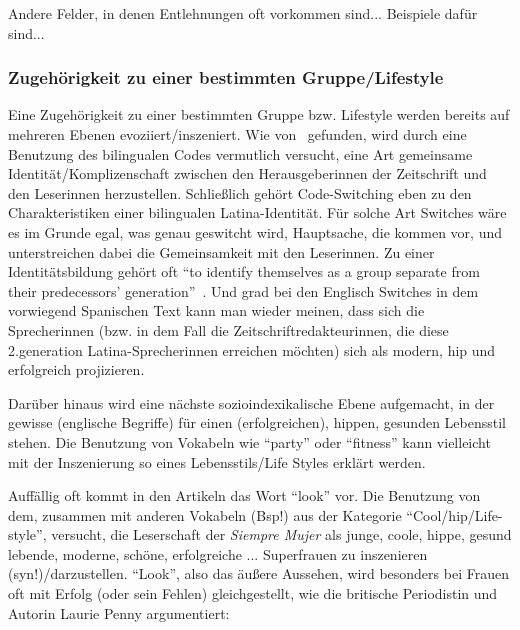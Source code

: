 Andere Felder, in denen Entlehnungen oft vorkommen sind...
Beispiele dafür sind...

\subsubsection{Zugehörigkeit zu einer bestimmten Gruppe/Lifestyle}
Eine Zugehörigkeit zu einer bestimmten Gruppe bzw. Lifestyle werden bereits auf mehreren Ebenen evoziiert/inszeniert.
Wie von~\cite{Ticknor12} gefunden, wird durch eine Benutzung des bilingualen Codes vermutlich versucht, eine Art gemeinsame Identität/Komplizenschaft zwischen den Herausgeberinnen der Zeitschrift und den Leserinnen herzustellen.
Schließlich gehört Code-Switching eben zu den Charakteristiken einer bilingualen Latina-Identität.
Für solche Art Switches wäre es im Grunde egal, was genau geswitcht wird, Hauptsache, die kommen vor, und unterstreichen dabei die Gemeinsamkeit mit den Leserinnen.
Zu einer Identitätsbildung gehört oft ``to identify themselves as a group separate from their predecessors’ generation''~\cite[]{Mahootian05}.
Und grad bei den Englisch Switches in dem vorwiegend Spanischen Text kann man wieder meinen, dass sich die Sprecherinnen (bzw. in dem Fall die Zeitschriftredakteurinnen, die diese 2.generation Latina-Sprecherinnen erreichen möchten) sich als modern, hip und erfolgreich projizieren.

Darüber hinaus wird eine nächste sozioindexikalische Ebene aufgemacht, in der gewisse (englische Begriffe) für einen (erfolgreichen), hippen, gesunden Lebensstil stehen. %
Die Benutzung von Vokabeln wie ``party'' oder ``fitness'' kann vielleicht mit der Inszenierung so eines Lebensstils/Life Styles erklärt werden.

Auffällig oft kommt in den Artikeln das Wort ``look'' vor.
Die Benutzung von dem, zusammen mit anderen Vokabeln (Bsp!) aus der Kategorie ``Cool/hip/Life-style'', versucht, die Leserschaft der \textit{Siempre Mujer} als junge, coole, hippe, gesund lebende, moderne, schöne, erfolgreiche ... Superfrauen zu inszenieren (syn!)/darzustellen.
``Look'', also das äußere Aussehen, wird besonders bei Frauen oft mit Erfolg (oder sein Fehlen) gleichgestellt, wie die britische Periodistin und Autorin Laurie Penny argumentiert:

